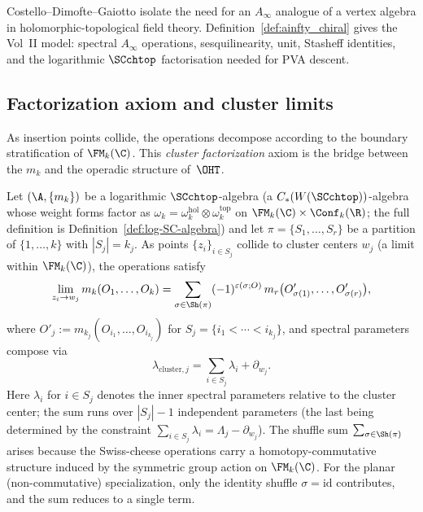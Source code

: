 \begin{remark}
\label{rem:physical-source-comparison}
Costello--Dimofte--Gaiotto \cite{CDG20} isolate the need for an
$A_\infty$ analogue of a vertex algebra in holomorphic-topological
field theory. Definition~\ref{def:ainfty_chiral} gives the Vol~II
model: spectral $A_\infty$ operations, sesquilinearity, unit,
Stasheff identities, and the logarithmic $\SCchtop$ factorisation
needed for PVA descent.
\end{remark}

\subsection{Factorization axiom and cluster limits}

As insertion points collide, the operations decompose according to the boundary stratification of $\FM_k(\C)$. This \emph{cluster factorization} axiom is the bridge between the $m_k$ and the operadic structure of~$\OHT$.

\begin{theorem}
\label{thm:cluster_factorization_homotopy}
Let $(\A, \{m_k\})$ be a logarithmic $\SCchtop$-algebra (a $C_\ast(W(\SCchtop))$-algebra whose weight forms factor as $\omega_k = \omega_k^{\mathrm{hol}} \otimes \omega_k^{\mathrm{top}}$ on $\FM_k(\C) \times \Conf_k(\R)$; the full definition is Definition~\ref{def:log-SC-algebra}) and let $\pi = \{S_1,\ldots,S_r\}$ be a partition of $\{1,\ldots,k\}$ with $|S_j| = k_j$. As points $\{z_i\}_{i \in S_j}$ collide to cluster centers $w_j$ (a limit within $\FM_k(\C)$), the operations satisfy
\begin{equation}
\label{eq:cluster_factorization}
\lim_{z_i \to w_j} m_k(O_1,\ldots,O_k) = \sum_{\sigma \in \Sh(\pi)} (-1)^{\varepsilon(\sigma;O)} \, m_r\big(O'_{\sigma(1)},\ldots,O'_{\sigma(r)}\big),
\end{equation}
where $O'_j := m_{k_j}(O_{i_1},\ldots,O_{i_{k_j}})$ for $S_j = \{i_1 < \cdots < i_{k_j}\}$, and spectral parameters compose via
\begin{equation}
\label{eq:spectral_composition}
\lambda_{\text{cluster},j} = \sum_{i \in S_j} \lambda_i + \partial_{w_j}.
\end{equation}
Here $\lambda_i$ for $i \in S_j$ denotes the inner spectral parameters relative to the cluster center; the sum runs over $|S_j| - 1$ independent parameters (the last being determined by the constraint $\sum_{i \in S_j} \lambda_i = \Lambda_j - \partial_{w_j}$).
The shuffle sum $\sum_{\sigma\in\Sh(\pi)}$ arises because the Swiss-cheese
operations carry a homotopy-commutative structure induced by the symmetric
group action on $\FM_k(\C)$. For the planar (non-commutative) specialization,
only the identity shuffle $\sigma=\mathrm{id}$ contributes, and the sum
reduces to a single term.
\end{theorem}

